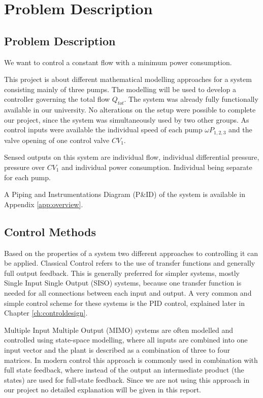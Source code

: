 \chapter{Problem Description}\label{ch:probdesc}

\section{Problem Description}
We want to control a constant flow with a minimum power consumption.

This project is about different mathematical modelling approaches for a system consisting mainly of three pumps.
The modelling will be used to develop a controller governing the total flow $Q_{tot}$.
The system was already fully functionally available in our university.
No alterations on the setup were possible to complete our project,
since the system was simultaneously used by two other groups.
As control inputs were available the individual speed of each pump $\omega P_{1,2,3}$ and the valve opening of one control valve $CV_1$.

Sensed outputs on this system are individual flow, individual differential pressure, pressure over $CV_1$ and individual power consumption.
Individual being separate for each pump.

A Piping and Instrumentations Diagram (P\&ID) of the system is available in Appendix \ref{app:overview}.


\section{Control Methods}
Based on the properties of a system two different approaches to controlling it can be applied.
Classical Control refers to the use of transfer functions
and generally full output feedback.
This is generally preferred for simpler systems,
mostly Single Input Single Output (SISO) systems,
because one transfer function is needed for all connections between each input and output.
A very common and simple control scheme for these systems is the PID control,
explained later in Chapter \ref{ch:controldesign}.
\cite{Franklin2014}

Multiple Input Multiple Output (MIMO) systems are often modelled and controlled using state-space
modelling, where all inputs are combined into one input vector
and the plant is described as a combination of three to four matrices.
In modern control this approach is commonly used in combination with full state feedback,
where instead of the output an intermediate product (the states) are used for full-state feedback.
Since we are not using this approach in our project no detailed explanation will be given in this report.


